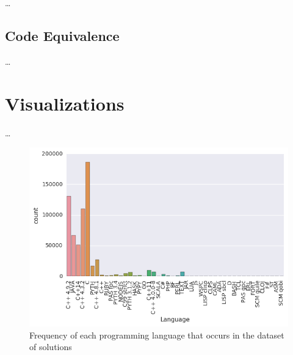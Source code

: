 \documentclass{article}
\begin{document}
\ldots{}

\subsection{Code Equivalence}\label{code-equivalence}

\ldots{}

\section{Visualizations}\label{visualizations}

\ldots{}

\begin{figure}[ht]
\vskip 0.2in
\begin{center}
\centerline{\includegraphics[width=\columnwidth]{../images/languages.png}}
\caption{Frequency of each programming language that occurs in the dataset of solutions }
\label{languages}
\end{center}
\vskip -0.2in
\end{figure}

\citet{kernalnlp}



\end{document}
